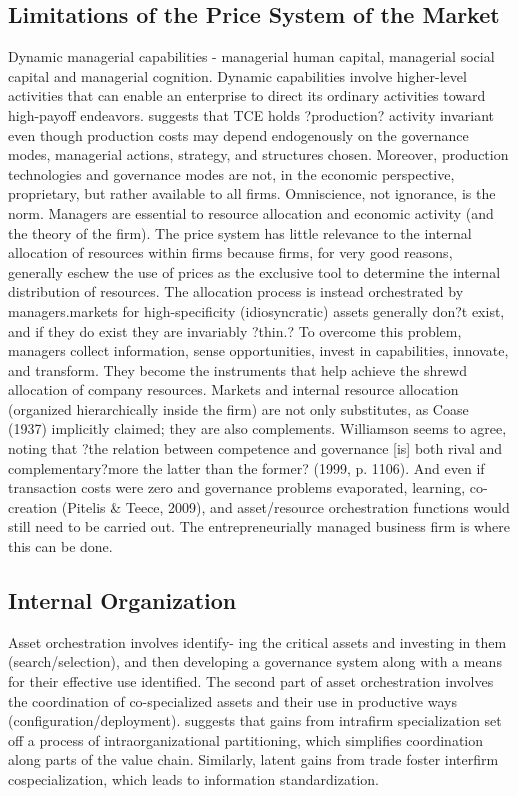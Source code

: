 \documentclass[12pt,letterpaper]{article}
\begin{document}
\subsection{Limitations of the Price System of the Market}
Dynamic managerial capabilities \cite{Adner2003} - managerial human capital, managerial social capital and managerial cognition. Dynamic capabilities involve higher-level activities that can enable an enterprise to direct its ordinary activities toward high-payoff endeavors. \cite{Teece2014b} suggests that TCE holds ?production? activity invariant even though production costs may depend endogenously on the governance modes, managerial actions, strategy, and structures chosen. Moreover, production technologies and governance modes are not, in the economic perspective, proprietary, but rather available to all firms. Omniscience, not ignorance, is the norm. Managers are essential to resource allocation and
economic activity (and the theory of the firm). The price system has little relevance to the internal allocation of resources within firms because firms, for very good reasons, generally eschew the use of prices as the exclusive tool to determine the internal distribution of resources. The allocation process is instead orchestrated by managers.markets for high-specificity (idiosyncratic) assets generally don?t exist, and if they do exist they are invariably ?thin.? To overcome this problem, managers collect information, sense opportunities, invest in capabilities, innovate, and transform. They become the instruments that help achieve the shrewd allocation of company resources. Markets and internal resource allocation (organized hierarchically inside the
firm) are not only substitutes, as Coase (1937) implicitly claimed; they are also complements. Williamson seems to agree, noting that ?the relation between competence and governance [is] both rival and complementary?more the latter than the former?
(1999, p. 1106). And even if transaction costs were zero and governance problems evaporated, learning, co-creation (Pitelis \& Teece, 2009), and asset/resource orchestration functions would still need to be carried out. The entrepreneurially managed business firm is where this can be done.

\subsection{Internal Organization}
Asset orchestration involves identify- ing the critical assets and investing in them (search/selection), and then developing a governance system along with a means for their effective use identified. The second part of asset orchestration involves the coordination of co-specialized assets and their use in productive ways (configuration/deployment).
\cite{Jacobides2005b} suggests that gains from intrafirm specialization set off a process of intraorganizational partitioning, which simplifies coordination along parts of the value chain. Similarly, latent gains from trade foster interfirm cospecialization, which leads to information standardization.
\end{document}
